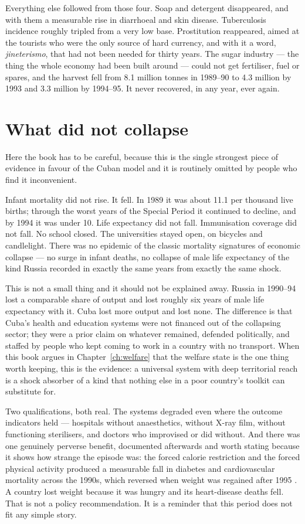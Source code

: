 Everything else followed from those four. Soap and detergent disappeared, and
with them a measurable rise in diarrhoeal and skin disease. Tuberculosis
incidence roughly tripled from a very low base. Prostitution reappeared, aimed
at the tourists who were the only source of hard currency, and with it a word,
\emph{jineterismo}, that had not been needed for thirty years. The sugar
industry --- the thing the whole economy had been built around --- could not get
fertiliser, fuel or spares, and the harvest fell from 8.1 million tonnes in
1989--90 to 4.3 million by 1993 and 3.3 million by 1994--95. It never
recovered, in any year, ever again.

\section{What did not collapse}

Here the book has to be careful, because this is the single strongest piece of
evidence in favour of the Cuban model and it is routinely omitted by people who
find it inconvenient.

Infant mortality did not rise. It fell. In 1989 it was about 11.1 per thousand
live births; through the worst years of the Special Period it continued to
decline, and by 1994 it was under 10.\unv{} Life expectancy did not fall.
Immunisation coverage did not fall. No school closed. The universities stayed
open, on bicycles and candlelight. There was no epidemic of the classic
mortality signatures of economic collapse --- no surge in infant deaths, no
collapse of male life expectancy of the kind Russia recorded in exactly the
same years from exactly the same shock.

This is not a small thing and it should not be explained away. Russia in
1990--94 lost a comparable share of output and lost roughly six years of male
life expectancy with it. Cuba lost more output and lost none. The difference is
that Cuba's health and education systems were not financed out of the collapsing
sector; they were a prior claim on whatever remained, defended politically, and
staffed by people who kept coming to work in a country with no transport. When
this book argues in Chapter~\ref{ch:welfare} that the welfare state is the one
thing worth keeping, this is the evidence: a universal system with deep
territorial reach is a shock absorber of a kind that nothing else in a poor
country's toolkit can substitute for.

Two qualifications, both real. The systems degraded even where the outcome
indicators held --- hospitals without anaesthetics, without X-ray film, without
functioning sterilisers, and doctors who improvised or did without. And there
was one genuinely perverse benefit, documented afterwards and worth stating
because it shows how strange the episode was: the forced calorie restriction and
the forced physical activity produced a measurable fall in diabetes and
cardiovascular mortality across the 1990s, which reversed when weight was
regained after 1995 \citep{franco2013}.\unv{} A country lost weight because it was hungry and its
heart-disease deaths fell. That is not a policy recommendation. It is a reminder
that this period does not fit any simple story.


